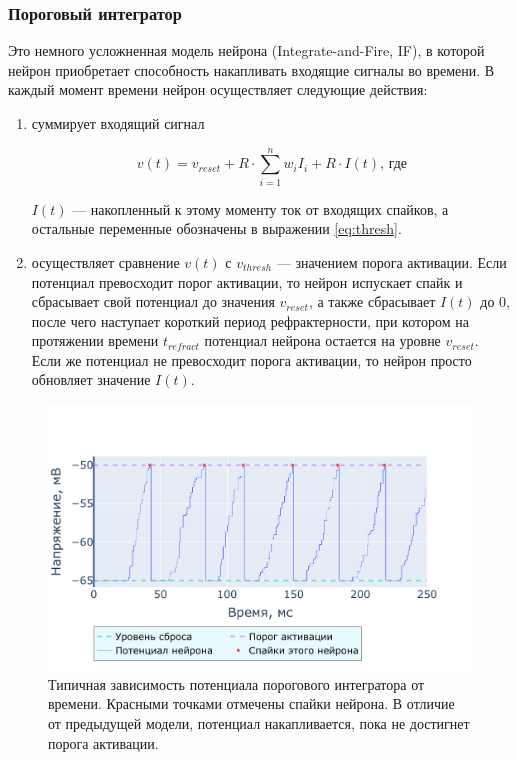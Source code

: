 \documentclass[a4paper]{article}
\begin{document}
\subsubsection{Пороговый интегратор}
Это немного усложненная модель нейрона (Integrate-and-Fire, IF), в которой нейрон приобретает способность накапливать входящие сигналы во времени. В каждый момент времени нейрон осуществляет следующие действия:

\begin{enumerate}
 \item суммирует входящий сигнал

\begin{equation} \label{eq:if}
v(t) = v_{reset} + R \cdot \sum_{i=1}^n {w_i I_i} + R \cdot I(t) \text{, где}
\end{equation}

$I(t)$ --- накопленный к этому моменту ток от входящих спайков, а остальные переменные обозначены в выражении \ref{eq:thresh}.

\item осуществляет сравнение $v(t)$ с $v_{thresh}$ --- значением порога активации. Если потенциал превосходит порог активации, то нейрон испускает спайк и сбрасывает свой потенциал до значения $v_{reset}$, а также сбрасывает $I(t)$ до 0, после чего наступает короткий период рефрактерности, при котором на протяжении времени $t_{refract}$ потенциал нейрона остается на уровне $v_{reset}$. Если же потенциал не превосходит порога активации, то нейрон просто обновляет значение $I(t)$.
\end{enumerate}

\begin{center}
\begin{figure}[H] 
 \includegraphics[width=\textwidth,keepaspectratio=true]{model_if_ru.pdf}
 \caption{Типичная зависимость потенциала порогового интегратора от времени. Красными точками отмечены спайки нейрона. В отличие от предыдущей модели, потенциал накапливается, пока не достигнет порога активации.}
\end{figure}
\end{center} 
\end{document}
